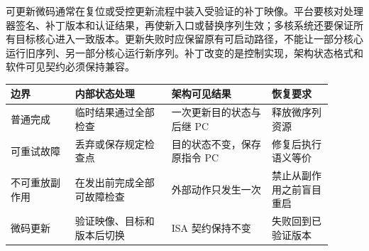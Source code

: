 可更新微码通常在复位或受控更新流程中装入受验证的补丁映像。平台要核对处理器签名、补丁版本和认证结果，再使新入口或替换序列生效；多核系统还要保证所有目标核心进入一致版本。更新失败时应保留原有可启动路径，不能让一部分核心运行旧序列、另一部分核心运行新序列。补丁改变的是控制实现，架构状态格式和软件可见契约必须保持兼容。

\begin{longtable}{L{0.18\linewidth}L{0.27\linewidth}L{0.28\linewidth}L{0.17\linewidth}}
\toprule
边界 & 内部状态处理 & 架构可见结果 & 恢复要求 \\
\midrule
普通完成 & 临时结果通过全部检查 & 一次更新目的状态与后继 PC & 释放微序列资源 \\\tablerowrule
可重试故障 & 丢弃或保存规定检查点 & 目的状态不变，保存原指令 PC & 修复后执行语义等价 \\\tablerowrule
不可重放副作用 & 在发出前完成全部可故障检查 & 外部动作只发生一次 & 禁止从副作用之前盲目重启 \\\tablerowrule
微码更新 & 验证映像、目标和版本后切换 & ISA 契约保持不变 & 失败回到已验证版本 \\
\bottomrule
\end{longtable}
